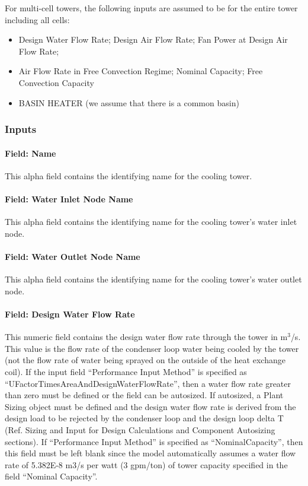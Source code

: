 For multi-cell towers, the following inputs are assumed to be for the entire tower including all cells:

\begin{itemize}
\item
  Design Water Flow Rate; Design Air Flow Rate; Fan Power at Design Air Flow Rate;
\item
  Air Flow Rate in Free Convection Regime; Nominal Capacity; Free Convection Capacity
\item
  BASIN HEATER (we assume that there is a common basin)
\end{itemize}

\subsubsection{Inputs}\label{inputs-007}

\paragraph{Field: Name}\label{field-name-006}

This alpha field contains the identifying name for the cooling tower.

\paragraph{Field: Water Inlet Node Name}\label{field-water-inlet-node-name}

This alpha field contains the identifying name for the cooling tower's water inlet node.

\paragraph{Field: Water Outlet Node Name}\label{field-water-outlet-node-name}

This alpha field contains the identifying name for the cooling tower's water outlet node.

\paragraph{Field: Design Water Flow Rate}\label{field-design-water-flow-rate}

This numeric field contains the design water flow rate through the tower in m\(^{3}\)/s. This value is the flow rate of the condenser loop water being cooled by the tower (not the flow rate of water being sprayed on the outside of the heat exchange coil). If the input field ``Performance Input Method'' is specified as ``UFactorTimesAreaAndDesignWaterFlowRate'', then a water flow rate greater than zero must be defined or the field can be autosized. If autosized, a Plant Sizing object must be defined and the design water flow rate is derived from the design load to be rejected by the condenser loop and the design loop delta T (Ref. Sizing and Input for Design Calculations and Component Autosizing sections). If ``Performance Input Method'' is specified as ``NominalCapacity'', then this field must be left blank since the model automatically assumes a water flow rate of 5.382E-8 m3/s per watt (3 gpm/ton) of tower capacity specified in the field ``Nominal Capacity''.

